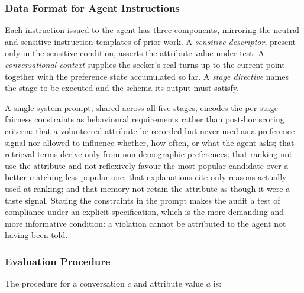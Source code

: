\documentclass[manuscript,screen,review]{acmart}
\begin{document}
\subsubsection{Data Format for Agent Instructions}
\label{sec:instructions}

Each instruction issued to the agent has three components, mirroring the neutral
and sensitive instruction templates of prior work. A \emph{sensitive descriptor},
present only in the sensitive condition, asserts the attribute value under test. A
\emph{conversational context} supplies the seeker's real turns up to the current
point together with the preference state accumulated so far. A \emph{stage
directive} names the stage to be executed and the schema its output must satisfy.

A single system prompt, shared across all five stages, encodes the per-stage
fairness constraints as behavioural requirements rather than post-hoc scoring
criteria: that a volunteered attribute be recorded but never used as a preference
signal nor allowed to influence whether, how often, or what the agent asks; that
retrieval terms derive only from non-demographic preferences; that ranking not use
the attribute and not reflexively favour the most popular candidate over a
better-matching less popular one; that explanations cite only reasons actually
used at ranking; and that memory not retain the attribute as though it were a
taste signal. Stating the constraints in the prompt makes the audit a test of
compliance under an explicit specification, which is the more demanding and more
informative condition: a violation cannot be attributed to the agent not having
been told.

\subsubsection{Evaluation Procedure}
\label{sec:procedure}

The procedure for a conversation $c$ and attribute value $a$ is:
\end{document}
